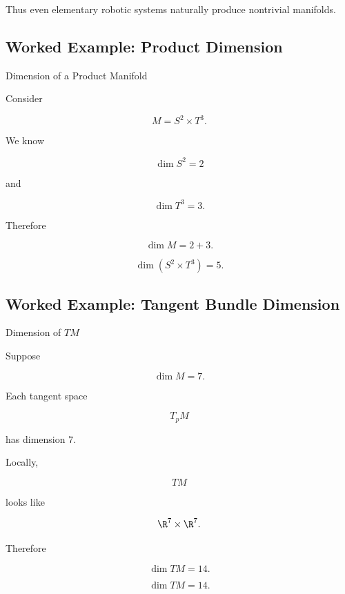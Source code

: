 Thus even elementary robotic systems naturally produce nontrivial
manifolds.

\subsection{Worked Example: Product Dimension}
\label{subsec:worked-product-dimension-manifold}

\begin{workedexamplebox}{Dimension of a Product Manifold}

Consider

\[
M=S^2\times T^3.
\]

We know

\[
\dim S^2=2
\]

and

\[
\dim T^3=3.
\]

Therefore

\[
\dim M
=
2+3.
\]

\begin{answerbox}
\[
\boxed{
\dim(S^2\times T^3)=5.
}
\]
\end{answerbox}
\end{workedexamplebox}

\subsection{Worked Example: Tangent Bundle Dimension}
\label{subsec:worked-tangent-bundle-dimension}

\begin{workedexamplebox}{Dimension of \(TM\)}

Suppose

\[
\dim M=7.
\]

Each tangent space

\[
T_pM
\]

has dimension \(7\).

Locally,

\[
TM
\]

looks like

\[
\R^7\times\R^7.
\]

Therefore

\[
\dim TM=14.
\]

\begin{answerbox}
\[
\boxed{
\dim TM=14.
}
\]
\end{answerbox}
\end{workedexamplebox}

